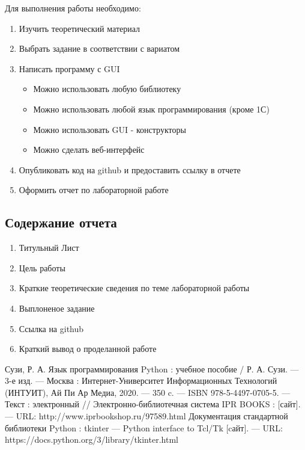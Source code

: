 \documentclass[a4paper]{article}
\begin{document}
Для выполнения работы необходимо:
\begin{enumerate}
  \item Изучить теоретический материал
  \item Выбрать задание в соответствии с вариатом
  \item Написать программу с GUI
    \begin{itemize}
      \item Можно использовать любую библиотеку
      \item Можно использовать любой язык программирования (кроме 1С)
      \item Можно использовать GUI - конструкторы
      \item Можно сделать веб-интерфейс
    \end{itemize}
  \item Опубликовать код на github и предоставить ссылку в отчете
  \item Оформить отчет по лабораторной работе
\end{enumerate}

\subsection{Содержание отчета}
\begin{enumerate}
  \item Титульный Лист
  \item Цель работы
  \item Краткие теоретические сведения по теме лабораторной работы
  \item Выплоненое задание
  \item Ссылка на github
  \item Краткий вывод о проделанной работе
\end{enumerate}

\begin{thebibliography}{3}
  Сузи, Р. А. Язык программирования Python : учебное пособие / Р. А. Сузи. — 3-е изд. — Москва : Интернет-Университет Информационных Технологий (ИНТУИТ), Ай Пи Ар Медиа, 2020. — 350 c. — ISBN 978-5-4497-0705-5. — Текст : электронный // Электронно-библиотечная система IPR BOOKS : [сайт]. — URL: http://www.iprbookshop.ru/97589.html
   Документация стандартной библиотеки Python : tkinter — Python interface to Tcl/Tk [cайт]. --- URL: https://docs.python.org/3/library/tkinter.html
\end{thebibliography}
\end{document}
